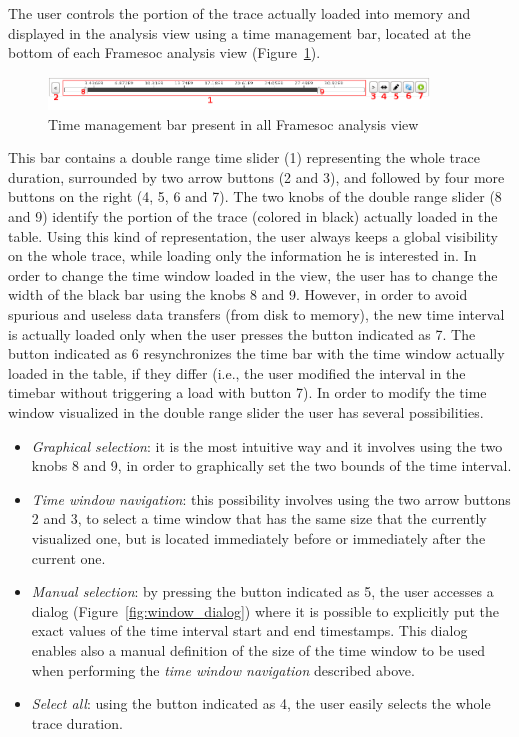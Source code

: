 \documentclass[twoside]{article}
\begin{document}
\begin{sloppypar}
The user controls the portion of the trace actually loaded into memory and displayed in the analysis view using a time management bar, located at the bottom of each Framesoc analysis view (Figure~\ref{fig:timebar}).

\begin{figure}[h!]
  \centering
    \includegraphics[width=0.9\textwidth]{images/time_bar.png}
  \caption{Time management bar present in all Framesoc analysis view}
  \label{fig:timebar}
\end{figure}

This bar contains a double range time slider (\num{1}) representing the whole trace duration, surrounded by two arrow buttons (\num{2} and \num{3}), and followed by four more buttons on the right (\num{4}, \num{5}, \num{6} and \num{7}).
The two knobs of the double range slider (\num{8} and \num{9}) identify the portion of the trace (colored in black) actually loaded in the table.
Using this kind of representation, the user always keeps a global visibility on the whole trace, while loading only the information he is interested in.
In order to change the time window loaded in the view, the user has to change the width of the black bar using the knobs \num{8} and \num{9}.
However, in order to avoid spurious and useless data transfers (from disk to memory), the new time interval is actually loaded only when the user presses the button indicated as \num{7}.
The button indicated as \num{6} resynchronizes the time bar with the time window actually loaded in the table, if they differ (i.e., the user modified the interval in the timebar without triggering a load with button \num{7}).
In order to modify the time window visualized in the double range slider the user has several possibilities. 
\begin{itemize}
 \item \emph{Graphical selection}: it is the most intuitive way and it involves using the two knobs \num{8} and \num{9}, in order to graphically set the two bounds of the time interval.
 \item \emph{Time window navigation}: this possibility involves using the two arrow buttons \num{2} and \num{3}, to select a time window that has the same size that the currently visualized one, but is located immediately before or immediately after the current one.
 \item \emph{Manual selection}: by pressing the button indicated as \num{5}, the user accesses a dialog (Figure~\ref{fig:window_dialog}) where it is possible to explicitly put the exact values of the time interval start and end timestamps. 
 This dialog enables also a manual definition of the size of the time window to be used when performing the \emph{time window navigation} described above.
 \item \emph{Select all}: using the button indicated as \num{4}, the user easily selects the whole trace duration.
\end{itemize}


\end{sloppypar}
\end{document}
